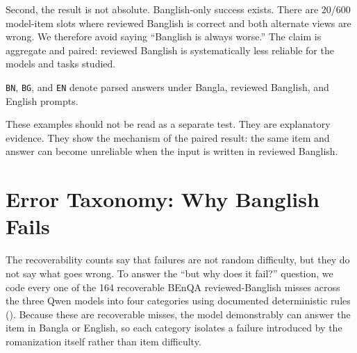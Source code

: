 Second, the result is not absolute. Banglish-only success exists. There are 20/600 model-item slots where reviewed Banglish is correct and both alternate views are wrong. We therefore avoid saying ``Banglish is always worse.'' The claim is aggregate and paired: reviewed Banglish is systematically less reliable for the models and tasks studied.

\begin{table}[H]
\centering
\caption{Example recoverable reviewed-Banglish misses from the BEnQA extension}
\label{tab:recoverable-examples}
\small
{}

\smallskip
{\footnotesize \texttt{BN}, \texttt{BG}, and \texttt{EN} denote parsed answers under Bangla, reviewed Banglish, and English prompts.}
\end{table}

These examples should not be read as a separate test. They are explanatory evidence. They show the mechanism of the paired result: the same item and answer can become unreliable when the input is written in reviewed Banglish.

\section{Error Taxonomy: Why Banglish Fails}

The recoverability counts say that failures are not random difficulty, but they do not say what goes wrong. To answer the ``but why does it fail?'' question, we code every one of the 164 recoverable BEnQA reviewed-Banglish misses across the three Qwen models into four categories using documented deterministic rules (). Because these are recoverable misses, the model demonstrably can answer the item in Bangla or English, so each category isolates a failure introduced by the romanization itself rather than item difficulty.

